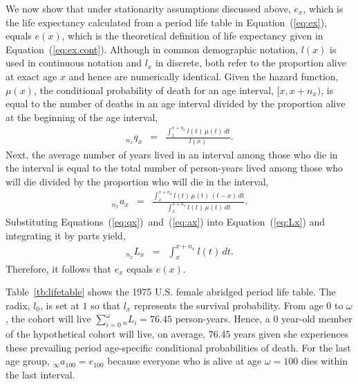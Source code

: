 \documentclass[11pt,letterpaper]{article}
\theoremstyle{plain}
\begin{document}
We now show that under stationarity assumptions discussed above,
$e_x$, which is the life expectancy calculated from a period life
table in Equation~(\ref{eq:ex}), equals $e(x)$, which is the
theoretical definition of life expectancy given in
Equation~(\ref{eq:ex.cont}).  Although in common demographic notation,
$l(x)$ is used in continuous notation and $l_x$ in discrete, both
refer to the proportion alive at exact age $x$ and hence are
numerically identical.  Given the hazard function, $\mu(x)$, the
conditional probability of death for an age interval, $[x,x+n_x)$, is
equal to the number of deaths in an age interval divided by the
proportion alive at the beginning of the age interval,
\begin{eqnarray}
  _{n_x}q_x & = & \frac{\int_x^{x+n_x} l(t)\,\mu(t)\,dt}{l(x)}. \label{eq:qx}
\end{eqnarray}
Next, the average number of years lived in an interval among those who
die in the interval is equal to the total number of person-years lived
among those who will die divided by the proportion who will die in the
interval,
\begin{eqnarray}
  _{n_x}a_x & = & \frac{\int_x^{x+n_x} l(t)\,\mu(t)\,(t-x)\,dt}
  {\int_x^{x+n_x}l(t)\,\mu(t)\,dt}. \label{eq:ax}
\end{eqnarray}
Substituting Equations~(\ref{eq:qx})~and~(\ref{eq:ax}) into
Equation~(\ref{eq:Lx}) and integrating it by parts yield,
\begin{eqnarray}
  _{n_x}L_x & = & \int_x^{x+n_x} l(t)\,dt. \label{eq:Lx_integral}
\end{eqnarray}  
Therefore, it follows that $e_x$ equals $e(x)$.

Table~\ref{tb:lifetable} shows the 1975 U.S. female abridged period
life table.  The radix, $l_0$, is set at $1$ so that $l_x$ represents
the survival probability.  From age $0$ to $\omega$,
the cohort will live
$\sum_{i=0}^{\omega}{_n}L_i=76.45$ person-years.  Hence, a $0$ year-old
member of the hypothetical cohort will live, on average, $76.45$ years
given she experiences these prevailing period age-specific
conditional probabilities of death.  For the last age group,
$_\infty a_{100}=e_{100}$ because everyone who is alive at age
$\omega=100$ dies within the last interval.
\end{document}
